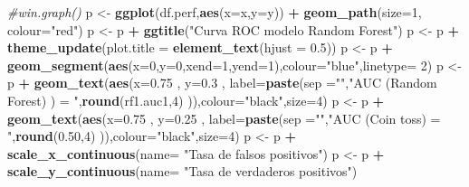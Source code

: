 \documentclass[]{book}
\newenvironment{Shaded}{\begin{snugshade}}{\end{snugshade}}
\newcommand{\CommentTok}[1]{\textcolor[rgb]{0.56,0.35,0.01}{\textit{#1}}}
\newcommand{\DataTypeTok}[1]{\textcolor[rgb]{0.13,0.29,0.53}{#1}}
\newcommand{\DecValTok}[1]{\textcolor[rgb]{0.00,0.00,0.81}{#1}}
\newcommand{\FloatTok}[1]{\textcolor[rgb]{0.00,0.00,0.81}{#1}}
\newcommand{\KeywordTok}[1]{\textcolor[rgb]{0.13,0.29,0.53}{\textbf{#1}}}
\newcommand{\NormalTok}[1]{#1}
\newcommand{\OperatorTok}[1]{\textcolor[rgb]{0.81,0.36,0.00}{\textbf{#1}}}
\newcommand{\StringTok}[1]{\textcolor[rgb]{0.31,0.60,0.02}{#1}}
\begin{document}
\begin{Shaded}
\begin{Highlighting}[]
\CommentTok{#win.graph()}
\NormalTok{p <-}\StringTok{ }\KeywordTok{ggplot}\NormalTok{(df.perf,}\KeywordTok{aes}\NormalTok{(}\DataTypeTok{x=}\NormalTok{x,}\DataTypeTok{y=}\NormalTok{y)) }\OperatorTok{+}\StringTok{ }\KeywordTok{geom_path}\NormalTok{(}\DataTypeTok{size=}\DecValTok{1}\NormalTok{, }\DataTypeTok{colour=}\StringTok{"red"}\NormalTok{)}
\NormalTok{p <-}\StringTok{ }\NormalTok{p }\OperatorTok{+}\StringTok{ }\KeywordTok{ggtitle}\NormalTok{(}\StringTok{"Curva ROC modelo Random Forest"}\NormalTok{)}
\NormalTok{p <-}\StringTok{ }\NormalTok{p }\OperatorTok{+}\StringTok{ }\KeywordTok{theme_update}\NormalTok{(}\DataTypeTok{plot.title =} \KeywordTok{element_text}\NormalTok{(}\DataTypeTok{hjust =} \FloatTok{0.5}\NormalTok{))}
\NormalTok{p <-}\StringTok{ }\NormalTok{p }\OperatorTok{+}\StringTok{ }\KeywordTok{geom_segment}\NormalTok{(}\KeywordTok{aes}\NormalTok{(}\DataTypeTok{x=}\DecValTok{0}\NormalTok{,}\DataTypeTok{y=}\DecValTok{0}\NormalTok{,}\DataTypeTok{xend=}\DecValTok{1}\NormalTok{,}\DataTypeTok{yend=}\DecValTok{1}\NormalTok{),}\DataTypeTok{colour=}\StringTok{"blue"}\NormalTok{,}\DataTypeTok{linetype=} \DecValTok{2}\NormalTok{)}
\NormalTok{p <-}\StringTok{ }\NormalTok{p }\OperatorTok{+}\StringTok{ }\KeywordTok{geom_text}\NormalTok{(}\KeywordTok{aes}\NormalTok{(}\DataTypeTok{x=}\FloatTok{0.75}\NormalTok{ , }\DataTypeTok{y=}\FloatTok{0.3}\NormalTok{ , }\DataTypeTok{label=}\KeywordTok{paste}\NormalTok{(}\DataTypeTok{sep =}\StringTok{""}\NormalTok{,}\StringTok{"AUC (Random Forest) ) = "}\NormalTok{,}\KeywordTok{round}\NormalTok{(rf1.auc1,}\DecValTok{4}\NormalTok{) )),}\DataTypeTok{colour=}\StringTok{"black"}\NormalTok{,}\DataTypeTok{size=}\DecValTok{4}\NormalTok{)}
\NormalTok{p <-}\StringTok{ }\NormalTok{p }\OperatorTok{+}\StringTok{ }\KeywordTok{geom_text}\NormalTok{(}\KeywordTok{aes}\NormalTok{(}\DataTypeTok{x=}\FloatTok{0.75}\NormalTok{ , }\DataTypeTok{y=}\FloatTok{0.25}\NormalTok{ , }\DataTypeTok{label=}\KeywordTok{paste}\NormalTok{(}\DataTypeTok{sep =}\StringTok{""}\NormalTok{,}\StringTok{"AUC (Coin toss) = "}\NormalTok{,}\KeywordTok{round}\NormalTok{(}\FloatTok{0.50}\NormalTok{,}\DecValTok{4}\NormalTok{) )),}\DataTypeTok{colour=}\StringTok{"black"}\NormalTok{,}\DataTypeTok{size=}\DecValTok{4}\NormalTok{)}
\NormalTok{p <-}\StringTok{ }\NormalTok{p }\OperatorTok{+}\StringTok{ }\KeywordTok{scale_x_continuous}\NormalTok{(}\DataTypeTok{name=} \StringTok{"Tasa de falsos positivos"}\NormalTok{)}
\NormalTok{p <-}\StringTok{ }\NormalTok{p }\OperatorTok{+}\StringTok{ }\KeywordTok{scale_y_continuous}\NormalTok{(}\DataTypeTok{name=} \StringTok{"Tasa de verdaderos positivos"}\NormalTok{)}

\end{Highlighting}
\end{Shaded}
\end{document}
